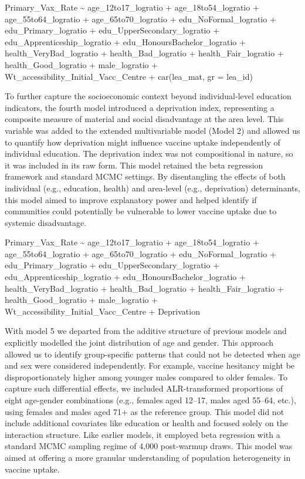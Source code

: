 \documentclass{article}
\begin{document}
Primary\_Vax\_Rate \textasciitilde{} age\_12to17\_logratio +
age\_18to54\_logratio + age\_55to64\_logratio + age\_65to70\_logratio +
edu\_NoFormal\_logratio + edu\_Primary\_logratio +
edu\_UpperSecondary\_logratio + edu\_Apprenticeship\_logratio +
edu\_HonoursBachelor\_logratio + health\_VeryBad\_logratio +
health\_Bad\_logratio + health\_Fair\_logratio + health\_Good\_logratio
+ male\_logratio + Wt\_accessibility\_Initial\_Vacc\_Centre +
car(lea\_mat, gr = lea\_id)

To further capture the socioeconomic context beyond individual-level
education indicators, the fourth model introduced a deprivation index,
representing a composite measure of material and social disadvantage at
the area level. This variable was added to the extended multivariable
model (Model 2) and allowed us to quantify how deprivation might
influence vaccine uptake independently of individual education. The
deprivation index was not compositional in nature, so it was included in
its raw form. This model retained the beta regression framework and
standard MCMC settings. By disentangling the effects of both individual
(e.g., education, health) and area-level (e.g., deprivation)
determinants, this model aimed to improve explanatory power and helped
identify if communities could potentially be vulnerable to lower vaccine
uptake due to systemic disadvantage.

Primary\_Vax\_Rate \textasciitilde{} age\_12to17\_logratio +
age\_18to54\_logratio + age\_55to64\_logratio + age\_65to70\_logratio +
edu\_NoFormal\_logratio + edu\_Primary\_logratio +
edu\_UpperSecondary\_logratio + edu\_Apprenticeship\_logratio +
edu\_HonoursBachelor\_logratio + health\_VeryBad\_logratio +
health\_Bad\_logratio + health\_Fair\_logratio + health\_Good\_logratio
+ male\_logratio + Wt\_accessibility\_Initial\_Vacc\_Centre +
Deprivation

With model 5 we departed from the additive structure of previous models
and explicitly modelled the joint distribution of age and gender. This
approach allowed us to identify group-specific patterns that could not
be detected when age and sex were considered independently. For example,
vaccine hesitancy might be disproportionately higher among younger males
compared to older females. To capture such differential effects, we
included ALR-transformed proportions of eight age-gender combinations
(e.g., females aged 12--17, males aged 55--64, etc.), using females and
males aged 71+ as the reference group. This model did not include
additional covariates like education or health and focused solely on the
interaction structure. Like earlier models, it employed beta regression
with a standard MCMC sampling regime of 4,000 post-warmup draws. This
model was aimed at offering a more granular understanding of population
heterogeneity in vaccine uptake.
\end{document}
